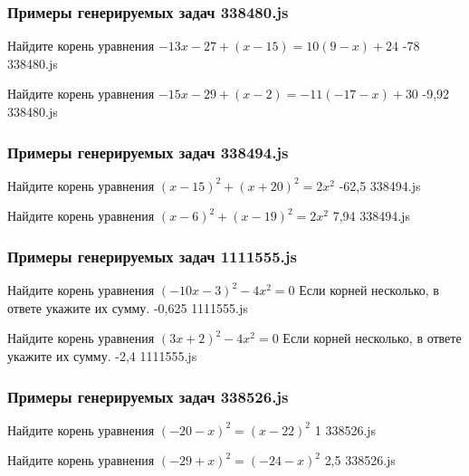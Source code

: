 
\subsubsection*{Примеры генерируемых задач 338480.js}   

\par{Найдите корень уравнения $−13x−27+(x−15)=10(9−x)+24$ }{ -78 }{338480.js}
\par{Найдите корень уравнения $−15x−29+(x−2)=−11(−17−x)+30$ }{ -9,92 }{338480.js}


\subsubsection*{Примеры генерируемых задач 338494.js}   

\par{Найдите корень уравнения $(x−15)^2+(x+20)^2=2x^2$ }{ -62,5 }{338494.js}
\par{Найдите корень уравнения $(x−6)^2+(x−19)^2=2x^2$ }{ 7,94 }{338494.js}


\subsubsection*{Примеры генерируемых задач 1111555.js}   

\par{Найдите корень уравнения $(−10x−3)^2−4x^2=0$ Если корней несколько, в ответе укажите их сумму. }{ -0,625 }{1111555.js}
\par{Найдите корень уравнения $(3x+2)^2−4x^2=0$ Если корней несколько, в ответе укажите их сумму. }{ -2,4 }{1111555.js}


\subsubsection*{Примеры генерируемых задач 338526.js}   

\par{Найдите корень уравнения $(−20−x)^2=(x−22)^2$ }{ 1 }{338526.js}
\par{Найдите корень уравнения $(−29+x)^2=(−24−x)^2$ }{ 2,5 }{338526.js}


